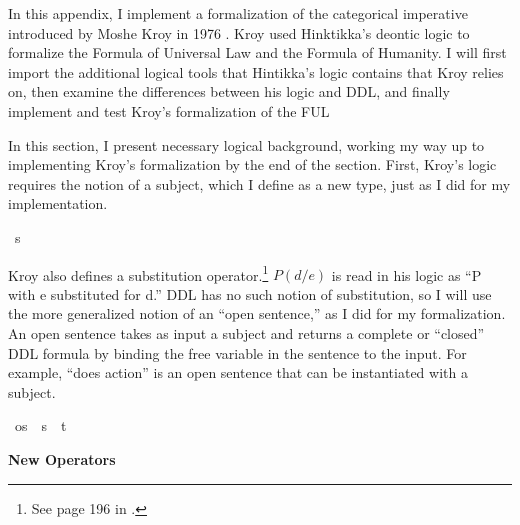\begin{isabellebody}
\begin{isamarkuptext}
\newpage%
\end{isamarkuptext}\isamarkuptrue%
%
\isadelimdocument
%
\endisadelimdocument
%
\isatagdocument
%
\isamarkuptrue%
%
\endisatagdocument
{\isafolddocument}%
%
\isadelimdocument
%
\endisadelimdocument
%
\begin{isamarkuptext}%
In this appendix, I implement a formalization of the categorical imperative introduced by Moshe Kroy in
1976 \citep{kroy}. Kroy used Hinktikka's deontic logic to formalize the Formula of Universal Law and
the Formula of Humanity. I will first import the additional logical tools that Hintikka's logic contains 
that Kroy relies on, then examine the differences between his logic and DDL, and finally implement 
and test Kroy's formalization of the FUL%
\end{isamarkuptext}\isamarkuptrue%
%
\isadelimdocument
%
\endisadelimdocument
%
\isatagdocument
%
\isamarkuptrue%
%
\endisatagdocument
{\isafolddocument}%
%
\isadelimdocument
%
\endisadelimdocument
%
\begin{isamarkuptext}%
In this section, I present necessary logical background, working my way up to implementing Kroy's
formalization by the end of the section. First, Kroy's logic requires the notion of a subject, 
which I define as a new type, just as I did for my implementation.%
\end{isamarkuptext}\isamarkuptrue%
\isamarkupfalse%
\ s\ %
%
\begin{isamarkuptext}%
Kroy also defines a substitution operator.\footnote{See page 196 in \citet{kroy}.}
$P (d/e)$ is read in his logic as ``P with e substituted 
for d.'' DDL has no such notion of substitution, so I will use the more generalized notion of an ``open 
sentence,'' as I did for my formalization. An open sentence takes as input a subject and returns a 
complete or ``closed'' DDL formula by binding the free variable in the sentence to the input. For example, 
``does action'' is an open sentence that can be instantiated with a subject.%
\end{isamarkuptext}\isamarkuptrue%
\isamarkupfalse%
\ os\ {\isacharequal}\ {\isachardoublequoteopen}{\isacharparenleft}s\ {\isasymRightarrow}\ t{\isacharparenright}{\isachardoublequoteclose}\isanewline
%
\isanewline
%
%
\begin{isamarkuptext}%
\noindent \textbf{New Operators}


\end{isamarkuptext}
\end{isabellebody}
